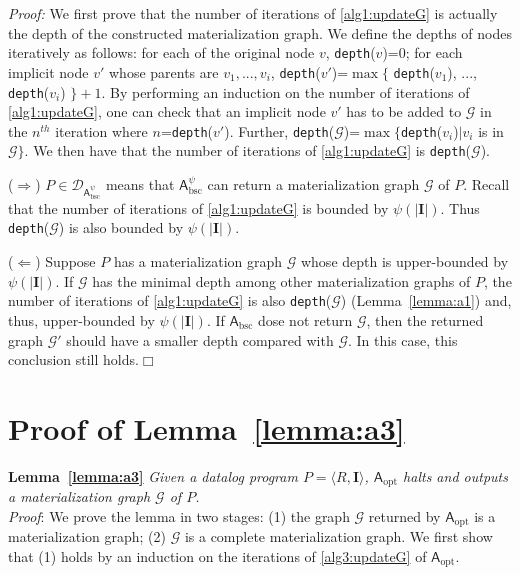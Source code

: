 \noindent\emph{Proof:} We first prove that the number of iterations of \ref{alg1:updateG}
is actually the depth of the constructed materialization graph.
We define the depths of nodes iteratively as follows:
for each of the original node $v$, \texttt{depth}($v$)=0;
for each implicit node $v'$ whose parents are $v_1,...,v_i$, \texttt{depth}($v'$)=$\max$$\{$ \texttt{depth}($v_1$), ..., \texttt{depth}($v_i$) $\}+1$.
By performing an induction on the number of iterations of \ref{alg1:updateG},
one can check that an implicit node $v'$ has to be added to $\mathcal{G}$ in the $n^{th}$ iteration
where $n$=\texttt{depth}($v'$).
Further, \texttt{depth}($\mathcal{G}$)=$\max$$\{$\texttt{depth}($v_i$)$|v_i$ is in $\mathcal{G}\}$.
We then have that the number of iterations of \ref{alg1:updateG} is \texttt{depth}($\mathcal{G}$).

($\Rightarrow$) $P\in\mathcal{D}_{\mathsf{A}_{\text{bsc}}^{\psi}}$ means that $\mathsf{A}_{\text{bsc}}^{\psi}$ can return
a materialization graph $\mathcal{G}$ of $P$.
Recall that the number of iterations of \ref{alg1:updateG} is bounded by $\psi(|\textbf{I}|)$.
Thus \texttt{depth}($\mathcal{G}$) is also bounded by $\psi(|\textbf{I}|)$.

($\Leftarrow$) Suppose $P$ has a materialization graph $\mathcal{G}$ whose depth
is upper-bounded by $\psi(|\textbf{I}|)$.
If $\mathcal{G}$ has the minimal depth among other materialization graphs of $P$,
the number of iterations of \ref{alg1:updateG} is also \texttt{depth}($\mathcal{G}$) (Lemma~\ref{lemma:a1})
and, thus, upper-bounded by $\psi(|\textbf{I}|)$.
If $\mathsf{A}_{\text{bsc}}$ dose not return $\mathcal{G}$, then the returned graph $\mathcal{G}'$
should have a smaller depth compared with $\mathcal{G}$.
In this case, this conclusion still holds.\hfill$\Box$

\section{Proof of Lemma~\ref{lemma:a3}}

\textbf{Lemma~\ref{lemma:a3}}
\emph{Given a datalog program $P=\langle R, \textbf{I}\rangle$,
$\mathsf{A}_{\text{opt}}$ halts and outputs a materialization graph
$\mathcal{G}$ of $P$.}\\

\noindent\emph{Proof}: We prove the lemma in two stages:
(1) the graph $\mathcal{G}$ returned by $\mathsf{A}_{\text{opt}}$ is a materialization graph;
(2) $\mathcal{G}$ is a complete materialization graph.
We first show that (1) holds by an induction on the iterations of \ref{alg3:updateG} of $\mathsf{A}_{\text{opt}}$.

